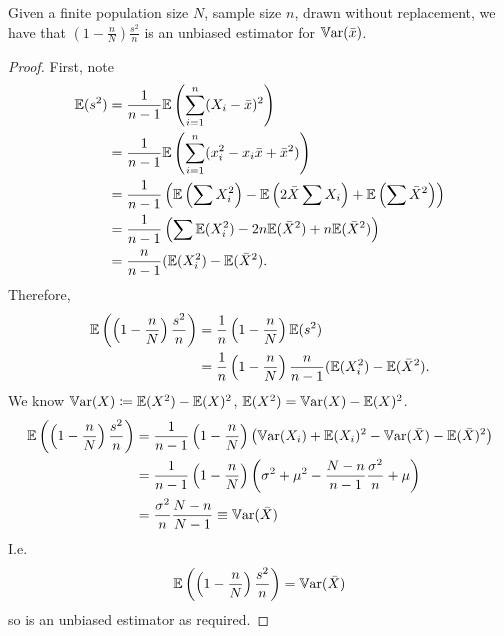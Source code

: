 \documentclass[10pt, a4paper]{article}
\begin{document}
\begin{theorem}
    Given a finite population size $N$,
    sample size $n$,
    drawn without replacement,
    we have that $\left(1 - \frac{n}{N}\right)\frac{s ^ 2}{n}$ is an unbiased estimator for $\mathbb{V}\mathrm{ar}(\bar{x})$.

    \begin{proof}
        First,
        note
        \begin{align*}
            \mathbb{E}(s ^ 2) &= \frac{1}{n - 1}\mathbb{E}\left(\sum_{i = 1}^{n}(X_i - \bar{x}) ^ 2\right) \\
            &= \frac{1}{n - 1}\mathbb{E}\left(\sum_{i = 1}^{n}(x_i ^ 2 - x_i\bar{x} + \bar{x} ^ 2)\right) \\
            &= \frac{1}{n - 1}\left(\mathbb{E}\left(\sum X_i ^ 2\right) - \mathbb{E}\left(2\bar{X}\sum X_i\right) + \mathbb{E}\left(\sum \bar{X} ^ 2\right)\right) \\
            &= \frac{1}{n - 1}\left(\sum\mathbb{E}(X_i ^ 2) - 2n\mathbb{E}(\bar{X} ^ 2) + n\mathbb{E}(\bar{X} ^ 2)\right) \\
            &= \frac{n}{n - 1}(\mathbb{E}(X_i ^ 2) - \mathbb{E}(\bar{X} ^ 2).
        \end{align*}
        Therefore,
        \begin{align*}
            \mathbb{E}\left(\left(1 - \frac{n}{N}\right)\frac{s ^ 2}{n}\right) &= \frac{1}{n}\left(1 - \frac{n}{N}\right)\mathbb{E}(s ^ 2) \\
            &= \frac{1}{n}\left(1 - \frac{n}{N}\right)\frac{n}{n - 1}(\mathbb{E}(X_i ^ 2) - \mathbb{E}(\bar{X} ^ 2).
        \end{align*}
        We know $\mathbb{V}\mathrm{ar}(X) \coloneqq \mathbb{E}(X ^ 2) - \mathbb{E}(X) ^ 2$,
        $\mathbb{E}(X ^ 2) = \mathbb{V}\mathrm{ar}(X) - \mathbb{E}(X) ^ 2$.
        \begin{align*}
            \mathbb{E}\left(\left(1 - \frac{n}{N}\right)\frac{s ^ 2}{n}\right) &= \frac{1}{n - 1}\left(1 - \frac{n}{N}\right)\left(\mathbb{V}\mathrm{ar}(X_i) + \mathbb{E}(X_i) ^ 2 - \mathbb{V}\mathrm{ar}(\bar{X}) - \mathbb{E}(\bar{X}) ^ 2\right) \\
            &= \frac{1}{n - 1}\left(1 - \frac{n}{N}\right)\left(\sigma ^ 2 + \mu ^ 2 - \frac{N - n}{n - 1}\frac{\sigma ^ 2}{n} + \mu\right) \\
            &= \frac{\sigma ^ 2}{n}\frac{N - n}{N - 1} \equiv \mathbb{V}\mathrm{ar}(\bar{X})
        \end{align*}
        I.e.
        \[
        \mathbb{E}\left(\left(1 - \frac{n}{N}\right)\frac{s ^ 2}{n}\right) = \mathbb{V}\mathrm{ar}(\bar{X})
        \]
        so is an unbiased estimator as required.
    \end{proof}
\end{theorem}
\end{document}
